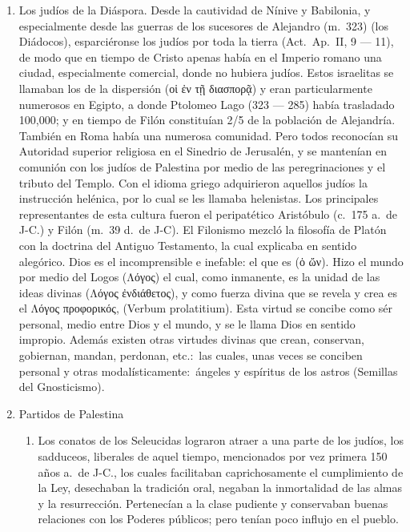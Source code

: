\raggedbottom{} \documentclass[12pt, a4paper, openany]{book} %
\begin{document}
\begin{enumerate}
  \item Los judíos de la Diáspora. Desde la cautividad de Nínive y Babilonia, y especialmente desde las guerras de los sucesores de Alejandro (m.\ 323) (los Diádocos), esparciéronse los judíos por toda la tierra (Act.\ Ap.\ II, 9 --- 11), de modo que en tiempo de Cristo apenas había en el Imperio romano una ciudad, especialmente comercial, donde no hubiera judíos. Estos israelitas se llamaban los de la dispersión (\textgreek{οἱ ἐν τῇ διασπορᾷ}) y eran particularmente numerosos en Egipto, a donde Ptolomeo Lago (323 --- 285) había trasladado 100,000; y en tiempo de Filón constituían 2/5 de la población de Alejandría. También en Roma había una numerosa comunidad. Pero todos reconocían su Autoridad superior religiosa en el Sinedrio de Jerusalén, y se mantenían en comunión con los judíos de Palestina por medio de las peregrinaciones y el tributo del Templo. Con el idioma griego adquirieron aquellos judíos la instrucción helénica, por lo cual se les llamaba helenistas. Los principales representantes de esta cultura fueron el peripatético Aristóbulo (c.\ 175 a.\ de J-C.) y Filón (m.\ 39 d.\ de J-C). El Filonismo mezcló la filosofía de Platón con la doctrina del Antiguo Testamento, la cual explicaba en sentido alegórico. Dios es el incomprensible e inefable: el que es (\textgreek{ὁ ὤν}). Hizo el mundo por medio del Logos (\textgreek{Λόγος}) el cual, como inmanente, es la unidad de las ideas divinas (\textgreek{Λόγος ἐνδιάθετος}), y como fuerza divina que se revela y crea es el \textgreek{Λόγος προφορικός}, (Verbum prolatitium). Esta virtud se concibe como sér personal, medio entre Dios y el mundo, y se le llama Dios en sentido impropio. Además existen otras virtudes divinas que crean, conservan, gobiernan, mandan, perdonan, etc.:\ las cuales, unas veces se conciben personal y otras modalísticamente:\ ángeles y espíritus de los astros (Semillas del Gnosticismo).
  \item Partidos de Palestina \begin{enumerate}
          \item Los conatos de los Seleucidas lograron atraer a una parte de los judíos, los sadduceos, liberales de aquel tiempo, mencionados por vez primera 150 años a.\ de J-C., los cuales facilitaban caprichosamente el cumplimiento de la Ley, desechaban la tradición oral, negaban la inmortalidad de las almas y la resurrección. Pertenecían a la clase pudiente y conservaban buenas relaciones con los Poderes públicos; pero tenían poco influjo en el pueblo.

\end{enumerate}
\end{enumerate}
\end{document}
